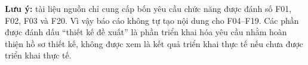 \documentclass[12pt,a4paper,oneside]{report}
\begin{document}
\textbf{Lưu ý:} tài liệu nguồn chỉ cung cấp bốn yêu cầu chức năng được đánh số F01, F02, F03 và F20. Vì vậy báo cáo không tự tạo nội dung cho F04--F19. Các phần được đánh dấu ``thiết kế đề xuất'' là phần triển khai hóa yêu cầu nhằm hoàn thiện hồ sơ thiết kế, không được xem là kết quả triển khai thực tế nếu chưa được triển khai thực tế.

\tableofcontents
\listoffigures
\listoftables

\clearpage
{}











\appendix






\end{document}
